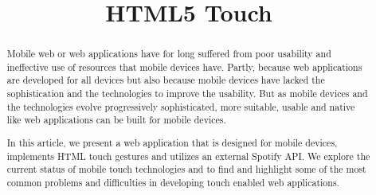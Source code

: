 \documentclass[conference]{IEEEtran}
\begin{document}
%
\title{HTML5 Touch}

\author{
\and
{}
\and
{}
}





\maketitle


\begin{abstract}





Mobile web or web applications have for long suffered from poor usability and ineffective use of resources that mobile devices have. Partly, because web applications are developed for all devices but also because mobile devices have lacked the sophistication and the technologies to improve the usability. But as mobile devices and the technologies evolve progressively sophisticated, more suitable, usable and native like web applications can be built for mobile devices.

In this article, we present a web application that is designed for mobile devices, implements HTML touch gestures and utilizes an external Spotify API. We explore the current status of mobile touch technologies and to find and highlight some of the most common problems and difficulties in developing touch enabled web applications. 


\end{abstract}
\end{document}
